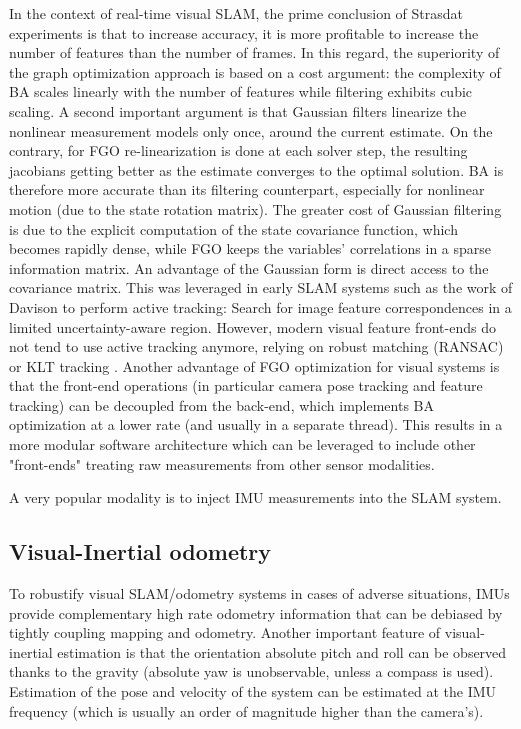 In the context of real-time visual SLAM, the prime conclusion of Strasdat experiments \cite{strasdat2012visual} is that to increase accuracy, it is more
profitable to increase the number of features than the number of frames. In this regard, the superiority of the graph optimization approach is 
based on a cost argument: the complexity of BA scales linearly with the number of features while filtering exhibits cubic scaling. A second important argument 
is that Gaussian filters linearize the nonlinear measurement models only once, around the current estimate. On the contrary, 
for FGO re-linearization is done at each solver step, the resulting jacobians getting better as the estimate converges
to the optimal solution. BA is therefore more accurate than its filtering counterpart, especially for nonlinear motion (due to the state rotation matrix).
The greater cost of Gaussian filtering is due to the explicit computation of the state covariance function, which becomes rapidly dense,
while FGO keeps the variables' correlations in a sparse information matrix. An advantage of the Gaussian form is direct access to the 
covariance matrix. This was leveraged in early SLAM systems such as the work of Davison \cite{davison2007monoslam} to perform active tracking: 
Search for image feature correspondences in a limited uncertainty-aware region. However, modern visual feature front-ends do not tend to
use active tracking anymore, relying on robust matching (RANSAC) \cite{mur2015orb} or KLT tracking \cite{baker2004lucas, ferrera2021ov}. Another advantage of 
FGO optimization for visual systems is that the front-end operations (in particular camera pose tracking and feature tracking) can be decoupled
from the back-end, which implements BA optimization at a lower rate (and usually in a separate thread). This results in a more modular software 
architecture which can be leveraged to include other "front-ends" treating raw measurements from other sensor modalities. 

A very popular modality is to inject IMU measurements into the SLAM system.


\subsection{Visual-Inertial odometry}
To robustify visual SLAM/odometry systems in cases of adverse situations, IMUs provide complementary high rate odometry information that can 
be debiased by tightly coupling mapping and odometry. Another important feature of visual-inertial estimation is that the orientation absolute 
pitch and roll can be observed thanks to the gravity (absolute yaw is unobservable, unless a compass is used). Estimation of the pose and velocity
of the system can be estimated at the IMU frequency (which is usually an order of magnitude higher than the camera's).

